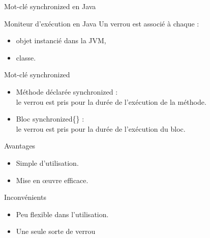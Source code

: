 \begin{frame}{Mot-clé \alert{synchronized} en Java}

  \begin{alertblock}{Moniteur d'exécution en Java}
    Un \alert{verrou} est associé à chaque :
    \begin{itemize}
    \item objet instancié dans la JVM,
    \item classe.
    \end{itemize}
  \end{alertblock}
  
  \begin{block}{Mot-clé \alert{synchronized}}
    \begin{itemize}
    \item Méthode  déclarée \alert{synchronized} :\\le  verrou est pris
      pour la durée de l'exécution de la méthode. 
    \item Bloc \alert{synchronized\{\}} :\\le  verrou est pris
      pour la durée de l'exécution du bloc.
    \end{itemize}
  \end{block}

  \pause

  \begin{minipage}{.47\textwidth}
    \begin{exampleblock}{Avantages}
      \begin{itemize}
      \item Simple d'utilisation.
      \item Mise en \oe uvre efficace.
      \end{itemize}
    \end{exampleblock}
  \end{minipage}
  \hfill
  \begin{minipage}{.47\textwidth}
    \begin{alertblock}{Inconvénients}
      \begin{itemize}
      \item Peu flexible dans l'utilisation.
      \item Une seule sorte de verrou 
      \end{itemize}
    \end{alertblock}
  \end{minipage}
\end{frame}

